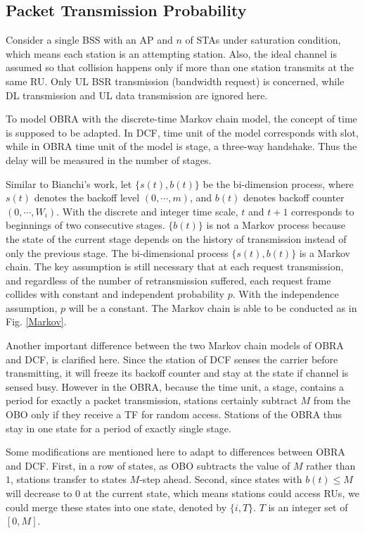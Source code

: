 \documentclass[journal]{IEEEtran}
\begin{document}
\subsection{Packet Transmission Probability}
Consider a single BSS with an AP and $n$ of STAs under saturation condition, which means each station is an attempting station. 
Also, the ideal channel is assumed so that collision happens only if more than one station transmits at the same RU.
Only UL BSR transmission (bandwidth request) is concerned, while DL transmission and UL data transmission are ignored here. 

To model OBRA with the discrete-time Markov chain model, the concept of time is supposed to be adapted. 
In DCF, time unit of the model corresponds with slot, while in OBRA time unit of the model is stage, a three-way handshake. 
Thus the delay will be measured in the number of stages.

Similar to Bianchi's work, let $\lbrace s(t), b(t) \rbrace$ be the bi-dimension process, where $s(t)$ denotes the backoff level $(0,\cdots, m)$, and $b(t)$ denotes backoff counter $(0,\cdots, W_i)$.
With the discrete and integer time scale, $t$ and $t+1$ corresponds to beginnings of two consecutive stages.
$\lbrace b(t) \rbrace$ is not a Markov process because the state of the current stage depends on the history of transmission instead of only the previous stage. 
The bi-dimensional process $\lbrace s(t),b(t) \rbrace$ is a Markov chain.
The key assumption is still necessary that at each request transmission, and regardless of the number of retransmission suffered, each request frame collides with constant and independent probability $p$.
With the independence assumption, $p$ will be a constant. The Markov chain is able to be conducted as in Fig. \ref{Markov}.

Another important difference between the two Markov chain models of OBRA and DCF, is clarified here.
Since the station of DCF senses the carrier before transmitting, it will freeze its backoff counter and stay at the state if channel is sensed busy. 
However in the OBRA, because the time unit, a stage, contains a period for exactly a packet transmission, stations certainly subtract $M$ from the OBO only if they receive a TF for random access. 
Stations of the OBRA thus stay in one state for a period of exactly single stage.

Some modifications are mentioned here to adapt to differences between OBRA and DCF. 
First, in a row of states, as OBO subtracts the value of $M$ rather than $1$, stations transfer to states $M$-step ahead.
Second, since states with $b(t)\leq M $ will decrease to $0$ at the current state, which means stations could access RUs, we could merge these states into one state, denoted by $\lbrace i, T \rbrace$. $T$ is an integer set of $[0,M]$. 
\end{document}
